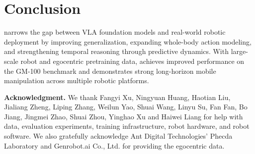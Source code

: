 \section{Conclusion}\label{sec:conclusion}
\method narrows the gap between VLA foundation models and real-world robotic deployment by improving generalization, expanding whole-body action modeling, and strengthening temporal reasoning through predictive dynamics. With large-scale robot and egocentric pretraining data, \method achieves improved performance on the GM-100 benchmark and demonstrates strong long-horizon mobile manipulation across multiple robotic platforms.



\noindent\textbf{Acknowledgment.}
We thank Fangyi Xu, Ningyuan Huang, Haotian Liu, Jialiang Zheng, Liping Zhang, Weilun Yao, Shuai Wang, Linyu Su, Fan Fan, Bo Jiang, Jingmei Zhao, Shuai Zhou, Yinghao Xu and Haiwei Liang for help with data, evaluation experiments, training infrastructure, robot hardware, and robot software.
We also gratefully acknowledge Ant Digital Technologies' Phecda Laboratory and Genrobot.ai Co., Ltd. for providing the egocentric data.





